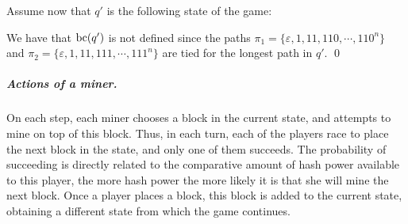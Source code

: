 \begin{example}
	Assume now that $q'$ is the following state of the game:
	\begin{center}
\end{center}
\vspace{-10pt}
We have that $\text{bc}(q')$ is not defined since the paths $\pi_1 = \{\varepsilon, 1, 11, 110, \cdots, 110^n\}$ and $\pi_2 = \{\varepsilon, 1, 11, 111, \cdots, 111^n\}$ are tied for the longest path in $q'$. \qed
\end{example}



\subparagraph*{Actions of a miner.} %
On each step, each miner
chooses a block in the current state, and attempts to mine on top of this block. Thus, in each turn, each of the players race to place the next block in the state, and only one of them succeeds. The probability of succeeding is directly related to the comparative amount of hash power available to this player, the more hash power the more likely it is that she will mine the next block. %
Once a player places a block, this block is added to the current state, obtaining a different state from which the game continues.

